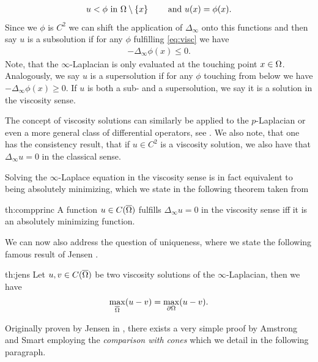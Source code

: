 %
\begin{align}\label{eq:visc}
u < \phi \text{ in } \Omega\setminus\{x\}\qquad\text{ and } u(x) = \phi(x).
\end{align}
%
Since we $\phi$ is $C^2$ we can shift the application of $\Delta_\infty$ onto this functions and then say $u$ is a subsolution if for any $\phi$ fulfilling \cref{eq:visc} we have
%
\begin{align*}
- \Delta_\infty \phi(x) \leq 0.
\end{align*}
%
Note, that the $\infty$-Laplacian is only evaluated at the touching point $x\in\Omega$. Analogously, we say $u$ is a supersolution if for any $\phi$ touching from below we have $- \Delta_\infty \phi(x) \geq 0$. If $u$ is both a sub- and a supersolution, we say it is a solution in the viscosity sense. 
%
\begin{remark}{}{}
The concept of viscosity solutions can similarly be applied to the $p$-Laplacian or even a more general class of differential operators, see \cite{lindqvist2017notes}. We also note, that one has the consistency result, that if $u\in C^2$ is a viscosity solution, we also have that $\Delta_\infty u = 0$ in the classical sense. 
\end{remark}
%
%
\noindent%
Solving the $\infty$-Laplace equation in the viscosity sense is in fact equivalent to being absolutely minimizing, which we state in the following theorem taken from \cite{aronsson2004tour}
%
\begin{theorem}{\cite[Theorem 4.13]{aronsson2004tour}}{th:compprinc}
A function $u\in C(\overline{\Omega})$ fulfills $\Delta_\infty u=0$ in the viscosity sense iff it is an absolutely minimizing function.
\end{theorem}
%
%
We can now also address the question of uniqueness, where we state the following famous result of Jensen \cite{jensen1993uniqueness}.
%
\begin{theorem}{\cite{jensen1993uniqueness}}{th:jens} 
Let $u,v\in C(\overline{\Omega})$ be two viscosity solutions of the $\infty$-Laplacian, then we have
%
\begin{align*}
\max_{\overline{\Omega}} (u - v) = \max_{\partial\Omega} (u - v).
\end{align*}
\end{theorem}
%
%
Originally proven by Jensen in \cite{jensen1993uniqueness}, there exists a very simple proof by Amstrong and Smart \cite{armstrong2010easy} employing the \emph{comparison with cones} which we detail in the following paragraph.
%
%
%
